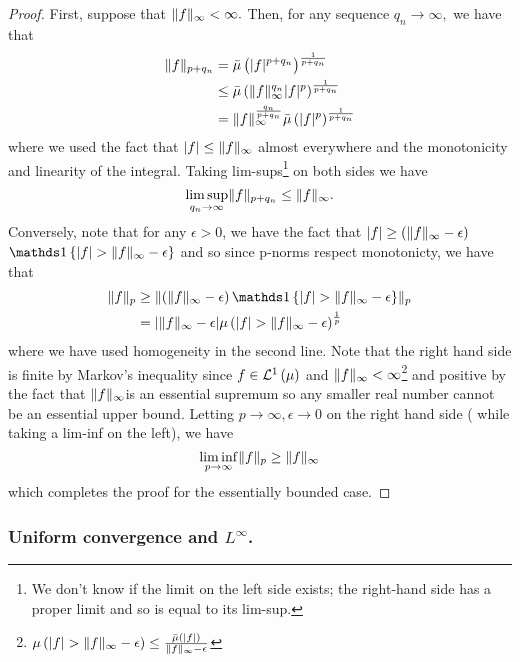 \begin{proof}
First, suppose that $\lVert f\rVert_{\infty}<\infty.$ Then, for any sequence
$q_{n}\to\infty,$ we have that 
\begin{align*}
\lVert f\rVert_{p+q_{n}} & =\bar{\mu}\left(\lvert f\rvert^{p+q_{n}}\right)^{\frac{1}{p+q_{n}}}\\
 & \leq\bar{\mu}\left(\lVert f\rVert_{\infty}^{q_{n}}\lvert f\rvert^{p}\right)^{\frac{1}{p+q_{n}}}\\
 & =\lVert f\rVert_{\infty}^{\frac{q_{n}}{p+q_{n}}}\bar{\mu}\left(\lvert f\rvert^{p}\right)^{\frac{1}{p+q_{n}}}
\end{align*}
where we used the fact that $\lvert f\rvert\leq\lVert f\rVert_{\infty}$
almost everywhere and the monotonicity and linearity of the integral.
Taking lim-sups\footnote{We don't know if the limit on the left side exists; the right-hand
side has a proper limit and so is equal to its lim-sup.} on both sides we have 
\[
\limsup_{q_{n}\to\infty}\lVert f\rVert_{p+q_{n}}\leq\lVert f\rVert_{\infty}.
\]
Conversely, note that for any $\epsilon>0$, we have the fact that
$\lvert f\rvert\geq\left(\lVert f\rVert_{\infty}-\epsilon\right)$$\indicate\left\{ \lvert f\rvert>\pnorm f{\infty}-\epsilon\right\} $
and so since p-norms respect monotonicty, we have that 
\begin{align*}
\pnorm fp & \geq\pnorm{\left(\pnorm f{\infty}-\epsilon\right)\indicate\left\{ \lvert f\rvert>\pnorm f{\infty}-\epsilon\right\} }p\\
 & =\lvert\pnorm f{\infty}-\epsilon\rvert\mu\left(\lvert f\rvert>\pnorm f{\infty}-\epsilon\right)^{\frac{1}{p}}
\end{align*}
where we have used homogeneity in the second line. Note that the right
hand side is finite by Markov's inequality since $f\in\mathcal{L}^{1}\left(\mu\right)$
and $\lVert f\rVert_{\infty}<\infty$\footnote{$\mu\left(\lvert f\rvert>\lVert f\rVert_{\infty}-\epsilon\right)\leq\frac{\bar{\mu}\left(\lvert f\rvert\right)}{\lVert f\rVert_{\infty}-\epsilon}$}
and positive by the fact that $\lVert f\rVert_{\infty}$is an essential supremum
so any smaller real number cannot be an essential upper bound. Letting
$p\to\infty,\epsilon\to0$ on the right hand side ( while taking a
lim-inf on the left), we have
\[
\liminf_{p\to\infty}\lVert f\rVert_{p}\geq\lVert f\rVert_{\infty}
\]
which completes the proof for the essentially bounded case.
\end{proof}

\subsubsection{Uniform convergence and $L^{\infty}$.}

